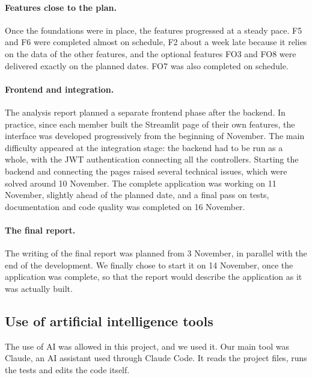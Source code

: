 \paragraph{Features close to the plan.} Once the foundations were in place, the features progressed at a steady pace. F5 and F6 were completed almost on schedule, F2 about a week late because it relies on the data of the other features, and the optional features FO3 and FO8 were delivered exactly on the planned dates. FO7 was also completed on schedule.

\paragraph{Frontend and integration.} The analysis report planned a separate frontend phase after the backend. In practice, since each member built the Streamlit page of their own features, the interface was developed progressively from the beginning of November. The main difficulty appeared at the integration stage: the backend had to be run as a whole, with the JWT authentication connecting all the controllers. Starting the backend and connecting the pages raised several technical issues, which were solved around 10 November. The complete application was working on 11 November, slightly ahead of the planned date, and a final pass on tests, documentation and code quality was completed on 16 November.

\paragraph{The final report.} The writing of the final report was planned from 3 November, in parallel with the end of the development. We finally chose to start it on 14 November, once the application was complete, so that the report would describe the application as it was actually built.


\subsection{Use of artificial intelligence tools}


The use of AI was allowed in this project, and we used it. Our main tool was Claude, an AI
assistant used through Claude Code. It reads the project files, runs the tests and edits the code
itself.

